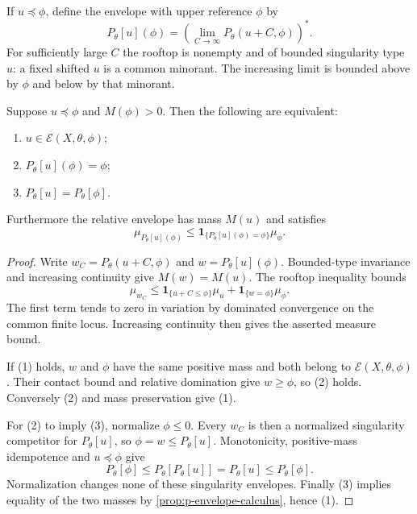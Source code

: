 \begin{definition}\label{def:relative-singularity-envelope}
If $u\preceq\phi$, define the envelope with upper reference $\phi$ by
\[
 P_\theta[u](\phi)
       =\left(\lim_{C\to\infty}P_\theta(u+C,\phi)\right)^*.
\]
For sufficiently large $C$ the rooftop is nonempty and of bounded singularity type $u$: a fixed shifted $u$ is a common minorant. The increasing limit is bounded above by $\phi$ and below by that minorant.
\end{definition}

\begin{proposition}\label{prop:relative-envelope-full-mass-characterization}
Suppose $u\preceq\phi$ and $M(\phi)>0$. Then the following are equivalent:
\begin{enumerate}
 \item $u\in\mathcal E(X,\theta,\phi)$;
 \item $P_\theta[u](\phi)=\phi$;
 \item $P_\theta[u]=P_\theta[\phi]$.
\end{enumerate}
Furthermore the relative envelope has mass $M(u)$ and satisfies
\[
 \mu_{P_\theta[u](\phi)}
       \leq\mathbf1_{\{P_\theta[u](\phi)=\phi\}}\mu_\phi.
\]
\end{proposition}
\begin{proof}
Write $w_C=P_\theta(u+C,\phi)$ and $w=P_\theta[u](\phi)$. Bounded-type invariance and increasing continuity give $M(w)=M(u)$. The rooftop inequality bounds
\[
 \mu_{w_C}\leq\mathbf1_{\{u+C\leq\phi\}}\mu_u
                  +\mathbf1_{\{w=\phi\}}\mu_\phi.
\]
The first term tends to zero in variation by dominated convergence on the common finite locus. Increasing continuity then gives the asserted measure bound.

If (1) holds, $w$ and $\phi$ have the same positive mass and both belong to $\mathcal E(X,\theta,\phi)$. Their contact bound and relative domination give $w\geq\phi$, so (2) holds. Conversely (2) and mass preservation give (1).

For (2) to imply (3), normalize $\phi\leq0$. Every $w_C$ is then a normalized singularity competitor for $P_\theta[u]$, so $\phi=w\leq P_\theta[u]$. Monotonicity, positive-mass idempotence and $u\preceq\phi$ give
\[
 P_\theta[\phi]\leq P_\theta[P_\theta[u]]=P_\theta[u]
                              \leq P_\theta[\phi].
\]
Normalization changes none of these singularity envelopes. Finally (3) implies equality of the two masses by \cref{prop:p-envelope-calculus}, hence (1).
\end{proof}

